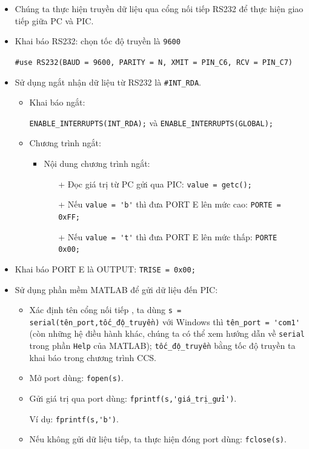 \begin{itemize}
\item Chúng ta thực hiện truyền dữ liệu qua cổng nối tiếp RS232 để thực hiện giao tiếp giữa PC và PIC.
\item Khai báo RS232: chọn tốc độ truyền là \verb|9600|

\verb|#use RS232(BAUD = 9600, PARITY = N, XMIT = PIN_C6, RCV = PIN_C7)|
\item Sử dụng ngắt nhận dữ liệu từ RS232 là \verb|#INT_RDA|.
\begin{itemize}
\item Khai báo ngắt: 

\verb|ENABLE_INTERRUPTS(INT_RDA);| và \verb|ENABLE_INTERRUPTS(GLOBAL);|
\item Chương trình ngắt: 
\begin{itemize}
\item Nội dung chương trình ngắt:
\begin{itemize}
\item[+] Đọc giá trị từ PC gửi qua PIC: \verb|value = getc();|
\item[+] Nếu \verb|value = 'b'| thì đưa PORT E lên mức cao: \verb|PORTE = 0xFF;|
\item[+] Nếu \verb|value = 't'| thì đưa PORT E lên mức thấp: \verb|PORTE  0x00;|
\end{itemize}
\end{itemize}
\end{itemize}
\item Khai báo PORT E là OUTPUT: \verb|TRISE = 0x00;|
\item Sử dụng phần mềm MATLAB để gửi dữ liệu đến PIC:
\begin{itemize}
\item Xác định  tên cổng nối tiếp , ta dùng \verb|s = serial(tên_port,tốc_độ_truyền)| với Windows thì \verb|tên_port = 'com1'| (còn những hệ điều hành khác, chúng ta có thể xem hướng dẫn về \verb|serial| trong phần \verb|Help| của MATLAB); \verb|tốc_độ_truyền| bằng tốc độ truyền ta khai báo trong chương trình CCS. 
\item Mở port dùng: \verb|fopen(s)|.
\item Gửi giá trị qua port dùng: \verb|fprintf(s,'giá_trị_gửi')|.

Ví dụ: \verb|fprintf(s,'b')|.
\item Nếu không gửi dữ liệu tiếp, ta thực hiện đóng port dùng: \verb|fclose(s)|.
\end{itemize}
\end{itemize}
\newpage
